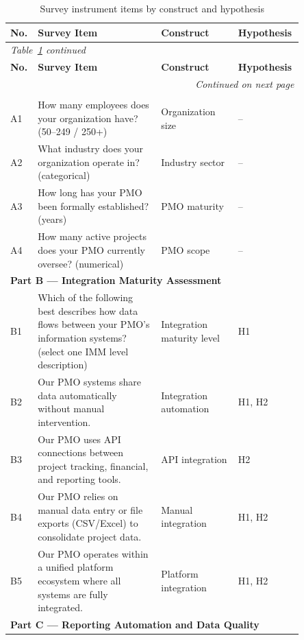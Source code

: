 {\singlespacing
\begin{longtable}{p{0.05\linewidth}p{0.40\linewidth}p{0.25\linewidth}p{0.15\linewidth}}
  \caption{Survey instrument items by construct and hypothesis}
  \label{tab:survey-questions}\\
  \toprule
  \textbf{No.} & \textbf{Survey Item} & \textbf{Construct} &
  \textbf{Hypothesis}\\
  \midrule
  \endfirsthead
  \multicolumn{4}{l}{\small\textit{Table~\ref{tab:survey-questions} continued}}\\
  \toprule
  \textbf{No.} & \textbf{Survey Item} & \textbf{Construct} &
  \textbf{Hypothesis}\\
  \midrule
  \endhead
  \midrule
  \multicolumn{4}{r}{\small\textit{Continued on next page}}\\
  \endfoot
  \bottomrule
  \endlastfoot
  \multicolumn{4}{l}{\textbf{Part A --- Organizational Profile}}\\
  A1 & How many employees does your organization have?
  (50--249 / 250+) & Organization size & --\\
  A2 & What industry does your organization operate in?
  (categorical) & Industry sector & --\\
  A3 & How long has your PMO been formally established?
  (years) & PMO maturity & --\\
  A4 & How many active projects does your PMO currently oversee?
  (numerical) & PMO scope & --\\
  \midrule
  \multicolumn{4}{l}{\textbf{Part B --- Integration Maturity Assessment}}\\
  B1 & Which of the following best describes how data flows
  between your PMO's information systems? (select one IMM level
  description) & Integration maturity level & H1\\
  B2 & Our PMO systems share data automatically without manual
  intervention. & Integration automation & H1, H2\\
  B3 & Our PMO uses API connections between project tracking,
  financial, and reporting tools. & API integration & H2\\
  B4 & Our PMO relies on manual data entry or file exports
  (CSV/Excel) to consolidate project data. & Manual integration & H1, H2\\
  B5 & Our PMO operates within a unified platform ecosystem
  where all systems are fully integrated. & Platform integration & H1, H2\\
  \midrule
  \multicolumn{4}{l}{\textbf{Part C --- Reporting Automation and Data Quality}}\\

\end{longtable}}
